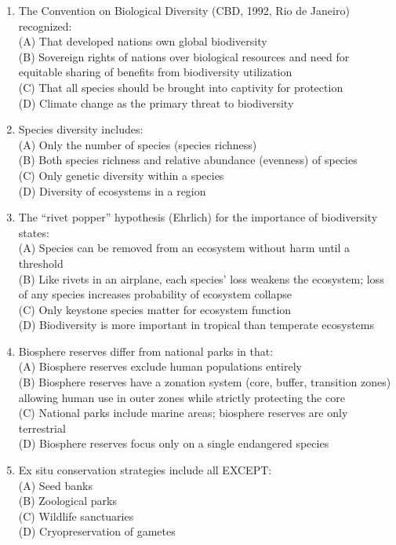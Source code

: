 \documentclass{article}
\begin{document}
\begin{enumerate}[label=Q\arabic*.]
\item The Convention on Biological Diversity (CBD, 1992, Rio de Janeiro) recognized:
\\(A) That developed nations own global biodiversity
\\(B) Sovereign rights of nations over biological resources and need for equitable sharing of benefits from biodiversity utilization
\\(C) That all species should be brought into captivity for protection
\\(D) Climate change as the primary threat to biodiversity

\item Species diversity includes:
\\(A) Only the number of species (species richness)
\\(B) Both species richness and relative abundance (evenness) of species
\\(C) Only genetic diversity within a species
\\(D) Diversity of ecosystems in a region

\item The ``rivet popper'' hypothesis (Ehrlich) for the importance of biodiversity states:
\\(A) Species can be removed from an ecosystem without harm until a threshold
\\(B) Like rivets in an airplane, each species' loss weakens the ecosystem; loss of any species increases probability of ecosystem collapse
\\(C) Only keystone species matter for ecosystem function
\\(D) Biodiversity is more important in tropical than temperate ecosystems

\item Biosphere reserves differ from national parks in that:
\\(A) Biosphere reserves exclude human populations entirely
\\(B) Biosphere reserves have a zonation system (core, buffer, transition zones) allowing human use in outer zones while strictly protecting the core
\\(C) National parks include marine areas; biosphere reserves are only terrestrial
\\(D) Biosphere reserves focus only on a single endangered species

\item Ex situ conservation strategies include all EXCEPT:
\\(A) Seed banks
\\(B) Zoological parks
\\(C) Wildlife sanctuaries
\\(D) Cryopreservation of gametes


\end{enumerate}
\end{document}
